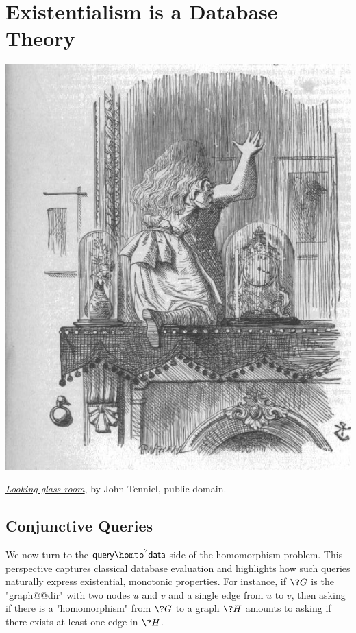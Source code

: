 \section{Existentialism is a Database Theory}
\label{sec:intro-existential}

\begin{marginfigure}[15em]
	\centering
	\includegraphics[width=\linewidth]{fig/intro/aliceroom.jpg}
	\caption{\href{https://commons.wikimedia.org/wiki/File:Aliceroom.jpg}{\emph{Looking glass room}}, by John Tenniel, public domain.}
\end{marginfigure}

\subsection{Conjunctive Queries}

We now turn to the $\textsf{query} \homto^? \textsf{data}$ side of the homomorphism problem. This perspective captures classical database evaluation and highlights how such queries naturally express existential, monotonic properties.
For instance, if $\?G$ is the "graph@@dir" with
two nodes $u$ and $v$ and a single edge from $u$ to $v$,
then asking if there is a "homomorphism" from $\?G$ to a graph $\?H$ amounts
to asking if there exists at least one edge in $\?H$.

